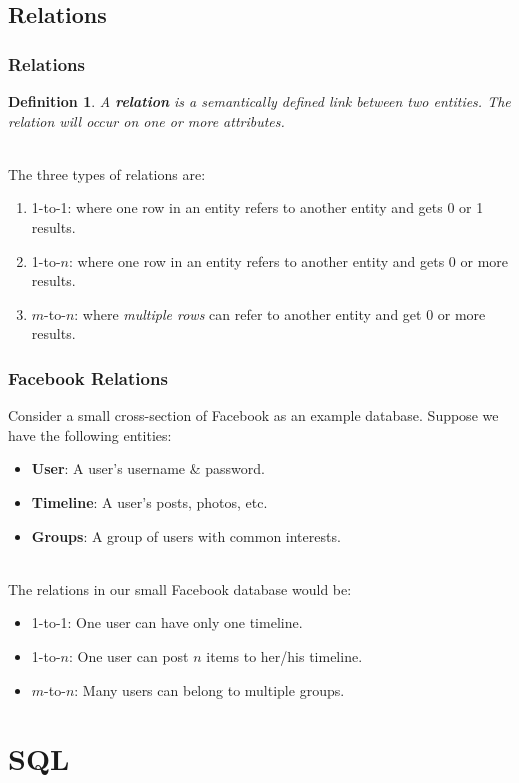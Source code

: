 \documentclass[aspectratio=169]{beamer}
\newtheorem{defn}{Definition}
\begin{document}
\subsection{Relations}
\begin{frame}
\frametitle{Relations}
\begin{defn}
A \textbf{relation} is a semantically defined link between two entities. The relation will occur on one or more attributes.
\end{defn}
\mbox{}\\
The three types of relations are:
\begin{enumerate}
	\item 1-to-1: where one row in an entity refers to another entity and gets 0 or 1 results.
	\item 1-to-$n$: where one row in an entity refers to another entity and gets 0 or more results.
	\item $m$-to-$n$: where \emph{multiple rows} can refer to another entity and get 0 or more results.
\end{enumerate}
\end{frame}

\begin{frame}
\frametitle{Facebook Relations}
Consider a small cross-section of Facebook as an example database. Suppose we have the following entities:
\begin{itemize}
	\item \textbf{User}: A user's username \& password.
	\item \textbf{Timeline}: A user's posts, photos, etc.
	\item \textbf{Groups}: A group of users with common interests.
\end{itemize}
\mbox{}\\
The relations in our small Facebook database would be:
\begin{itemize}
	\item 1-to-1: One user can have only one timeline.
	\item 1-to-$n$: One user can post $n$ items to her/his timeline.
	\item $m$-to-$n$: Many users can belong to multiple groups.
\end{itemize}
\end{frame}

\section{SQL}
\end{document}
